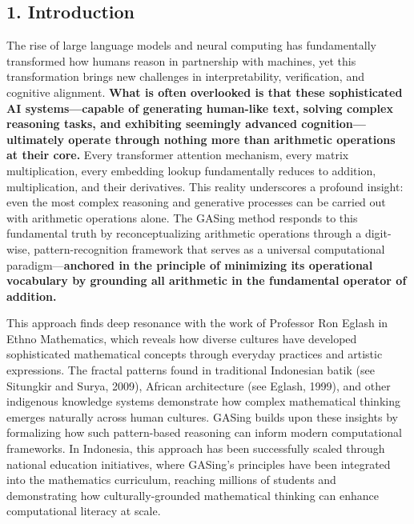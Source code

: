 \documentclass[11pt,a4paper]{article}
\begin{document}
\subsection{1. Introduction}
The rise of large language models and neural computing has fundamentally transformed how humans reason in partnership with machines, yet this transformation brings new challenges in interpretability, verification, and cognitive alignment. \textbf{What is often overlooked is that these sophisticated AI systems—capable of generating human-like text, solving complex reasoning tasks, and exhibiting seemingly advanced cognition—ultimately operate through nothing more than arithmetic operations at their core.} Every transformer attention mechanism, every matrix multiplication, every embedding lookup fundamentally reduces to addition, multiplication, and their derivatives. This reality underscores a profound insight: even the most complex reasoning and generative processes can be carried out with arithmetic operations alone. The GASing method responds to this fundamental truth by reconceptualizing arithmetic operations through a digit-wise, pattern-recognition framework that serves as a universal computational paradigm—\textbf{anchored in the principle of minimizing its operational vocabulary by grounding all arithmetic in the fundamental operator of addition.}

This approach finds deep resonance with the work of Professor Ron Eglash in Ethno Mathematics, which reveals how diverse cultures have developed sophisticated mathematical concepts through everyday practices and artistic expressions. The fractal patterns found in traditional Indonesian batik (see Situngkir and Surya, 2009), African architecture (see Eglash, 1999), and other indigenous knowledge systems demonstrate how complex mathematical thinking emerges naturally across human cultures. GASing builds upon these insights by formalizing how such pattern-based reasoning can inform modern computational frameworks. In Indonesia, this approach has been successfully scaled through national education initiatives, where GASing's principles have been integrated into the mathematics curriculum, reaching millions of students and demonstrating how culturally-grounded mathematical thinking can enhance computational literacy at scale.
\end{document}
